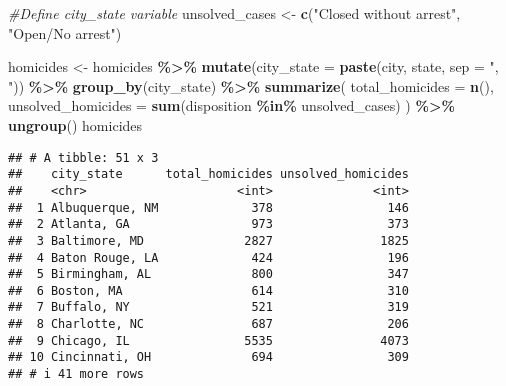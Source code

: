 \documentclass[
]{article}
\newenvironment{Shaded}{\begin{snugshade}}{\end{snugshade}}
\newcommand{\AttributeTok}[1]{\textcolor[rgb]{0.13,0.29,0.53}{#1}}
\newcommand{\CommentTok}[1]{\textcolor[rgb]{0.56,0.35,0.01}{\textit{#1}}}
\newcommand{\FunctionTok}[1]{\textcolor[rgb]{0.13,0.29,0.53}{\textbf{#1}}}
\newcommand{\NormalTok}[1]{#1}
\newcommand{\OtherTok}[1]{\textcolor[rgb]{0.56,0.35,0.01}{#1}}
\newcommand{\SpecialCharTok}[1]{\textcolor[rgb]{0.81,0.36,0.00}{\textbf{#1}}}
\newcommand{\StringTok}[1]{\textcolor[rgb]{0.31,0.60,0.02}{#1}}
\begin{document}
\begin{Shaded}
\begin{Highlighting}[]
\CommentTok{\#Define city\_state variable}
\NormalTok{unsolved\_cases }\OtherTok{\textless{}{-}} \FunctionTok{c}\NormalTok{(}\StringTok{"Closed without arrest"}\NormalTok{, }\StringTok{"Open/No arrest"}\NormalTok{)}

\NormalTok{homicides }\OtherTok{\textless{}{-}}\NormalTok{ homicides }\SpecialCharTok{\%\textgreater{}\%}
  \FunctionTok{mutate}\NormalTok{(}\AttributeTok{city\_state =} \FunctionTok{paste}\NormalTok{(city, state, }\AttributeTok{sep =} \StringTok{", "}\NormalTok{)) }\SpecialCharTok{\%\textgreater{}\%}  
  \FunctionTok{group\_by}\NormalTok{(city\_state) }\SpecialCharTok{\%\textgreater{}\%}
  \FunctionTok{summarize}\NormalTok{(}
    \AttributeTok{total\_homicides =} \FunctionTok{n}\NormalTok{(),}
    \AttributeTok{unsolved\_homicides =} \FunctionTok{sum}\NormalTok{(disposition }\SpecialCharTok{\%in\%}\NormalTok{ unsolved\_cases)}
\NormalTok{  ) }\SpecialCharTok{\%\textgreater{}\%}
  \FunctionTok{ungroup}\NormalTok{()}
\NormalTok{homicides}
\end{Highlighting}
\end{Shaded}

\begin{verbatim}
## # A tibble: 51 x 3
##    city_state      total_homicides unsolved_homicides
##    <chr>                     <int>              <int>
##  1 Albuquerque, NM             378                146
##  2 Atlanta, GA                 973                373
##  3 Baltimore, MD              2827               1825
##  4 Baton Rouge, LA             424                196
##  5 Birmingham, AL              800                347
##  6 Boston, MA                  614                310
##  7 Buffalo, NY                 521                319
##  8 Charlotte, NC               687                206
##  9 Chicago, IL                5535               4073
## 10 Cincinnati, OH              694                309
## # i 41 more rows
\end{verbatim}
\end{document}
